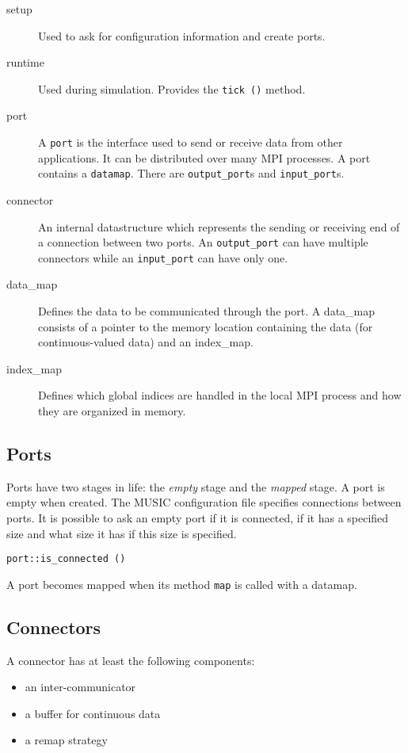 \documentclass[a4paper]{report}
\begin{document}
\begin{description}
  \item[setup] Used to ask for configuration information and create
    ports.
  \item[runtime] Used during simulation.  Provides the \verb|tick ()|
    method.
  \item[port] A \verb|port| is the interface used to send or receive
    data from other applications.  It can be distributed over many MPI
    processes.  A port contains a \verb|datamap|.  There are
    \verb|output_port|s and \verb|input_port|s.
  \item[connector] An internal datastructure which represents the
    sending or receiving end of a connection between two ports.  An
    \verb|output_port| can have multiple connectors while an
    \verb|input_port| can have only one.
  \item[data\_map] Defines the data to be communicated through the
    port.  A data\_map consists of a pointer to the memory location
    containing the data (for continuous-valued data) and an
    index\_map.
  \item[index\_map] Defines which global indices are handled in the
    local MPI process and how they are organized in memory.
\end{description}

\subsection{Ports}

Ports have two stages in life: the \emph{empty} stage and the
\emph{mapped} stage.  A port is empty when created.  The MUSIC
configuration file specifies connections between ports.  It is
possible to ask an empty port if it is connected, if it has a
specified size and what size it has if this size is specified.

\verb|port::is_connected ()|

A port becomes mapped when its method \verb|map| is called with a
datamap.

\subsection{Connectors}

A connector has at least the following components:
\begin{itemize}
  \item an inter-communicator
  \item a buffer for continuous data
  \item a remap strategy
\end{itemize}
\end{document}
